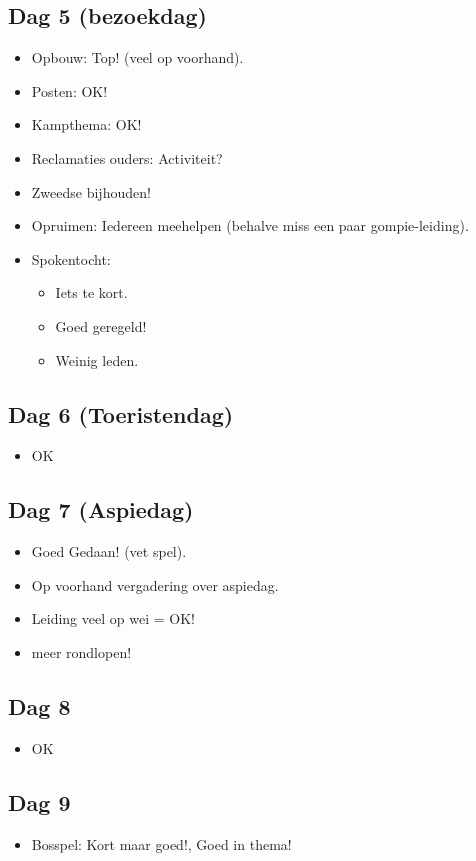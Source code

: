 \documentclass[pdftex,12pt,a4paper,english,titlepage]{article}
\begin{document}
\subsection{Dag 5 (bezoekdag)}
\begin{itemize}
	\item Opbouw: Top! (veel op voorhand).
	\item Posten: OK!
	\item Kampthema: OK!
	\item Reclamaties ouders: Activiteit?
	\item Zweedse bijhouden!
	\item Opruimen: Iedereen meehelpen (behalve miss een paar gompie-leiding).
	\item Spokentocht: \begin{itemize}
		\item Iets te kort.
		\item Goed geregeld!
		\item Weinig leden.
	\end{itemize}
\end{itemize}

\subsection{Dag 6 (Toeristendag)}
\begin{itemize}
	\item OK
\end{itemize}

\subsection{Dag 7 (Aspiedag)}
\begin{itemize}
	\item Goed Gedaan! (vet spel).
	\item Op voorhand vergadering over aspiedag.
	\item Leiding veel op wei = OK!
	\item meer rondlopen!
\end{itemize}

\subsection{Dag 8}
\begin{itemize}
	\item OK
\end{itemize}

\subsection{Dag 9}
\begin{itemize}
	\item Bosspel: Kort maar goed!, Goed in thema!
\end{itemize}
\end{document}
